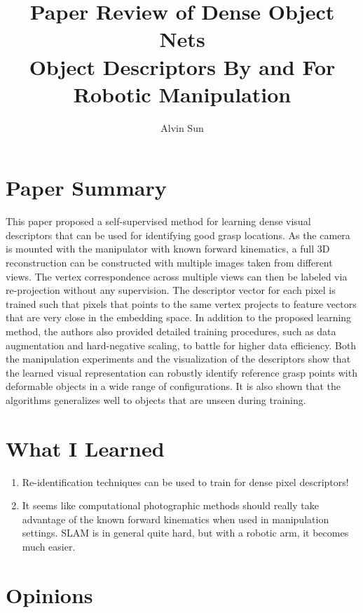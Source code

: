 \documentclass[10pt, twocolumn]{article}
\title{\vspace{-3.0em}Paper Review of Dense Object Nets\\
       Object Descriptors By and For Robotic Manipulation}
\author{Alvin Sun}
\begin{document}
\maketitle

\section{Paper Summary}
This paper proposed a self-supervised method for learning dense visual descriptors
that can be used for identifying good grasp locations. As the camera is mounted
with the manipulator with known forward kinematics, a full 3D reconstruction
can be constructed with multiple images taken from different views. The vertex correspondence
across multiple views can then be labeled via re-projection without any supervision.
The descriptor vector for each pixel is trained such that pixels that points to the
same vertex projects to feature vectors that are very close in the embedding space.
In addition to the proposed learning method, the authors also provided detailed
training procedures, such as data augmentation and hard-negative scaling, to battle for
higher data efficiency. Both the manipulation experiments and the visualization
of the descriptors show that the learned visual representation can robustly
identify reference grasp points with deformable objects in a wide range of
configurations. It is also shown that the algorithms generalizes well to
objects that are unseen during training.

\section{What I Learned}
\begin{enumerate}
  \item Re-identification techniques can be used to train for dense pixel descriptors!

  \item It seems like computational photographic methods should really take advantage
    of the known forward kinematics when used in manipulation settings. SLAM is
    in general quite hard, but with a robotic arm, it becomes much easier.
\end{enumerate}

\section{Opinions}
\end{document}

